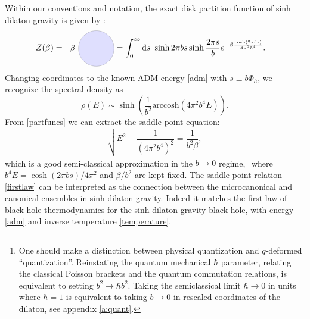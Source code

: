 \documentclass[a4paper,titlepage,12pt]{article}
\numberwithin{equation}{section}
\begin{document}
Within our conventions and notation, the exact disk partition function of sinh dilaton gravity is given by \cite{Mertens:2020hbs}:
\begin{align}
\label{partfuncs}
Z(\beta) &=~ \begin{tikzpicture}[baseline={([yshift=-.5ex]current bounding box.center)}, scale=0.5]
\draw[fill=blue!40!white,opacity=0.3] (0,0) ellipse (1.5 and 1.5);
\node at (-2,0) {\small $\beta$};
\end{tikzpicture} = \int_{0}^{\infty} \mathrm{d}s ~\sinh 2\pi b s \sinh\frac{2\pi s}{b} e^{-\beta \frac{\cosh(2\pi b s)}{4\pi^2b^4} }.
\end{align}
Changing coordinates to the known ADM energy \eqref{adm} with $s\equiv b\Phi_h$, we recognize the spectral density as
\begin{equation}
\rho(E) \sim \sinh\left(\frac{1}{b^2}\text{arccosh}( 4\pi^2b^4E)\right).
\end{equation}
From \eqref{partfuncs} we can extract the saddle point equation:
\begin{equation}
\label{firstlaw}
\sqrt{E^2-\frac{1}{(4\pi^2b^4)^2}} = \frac{1}{b^2 \beta},
\end{equation}
which is a good  semi-classical approximation in the $b\to 0$ regime,\footnote{One should make a distinction between physical quantization and $q$-deformed ``quantization''. Reinstating the quantum mechanical $\hbar$ parameter, relating the classical Poisson brackets and the quantum commutation relations, is equivalent to setting $b^2\rightarrow \hbar b^2$. Taking the semiclassical limit $\hbar\rightarrow0$ in units where $\hbar=1$ is equivalent to taking $b\rightarrow0$ in rescaled coordinates of the dilaton, see appendix \ref{a:quant}. } where $b^4E = \cosh(2\pi bs)/4\pi^2$ and $\beta/b^2$ are kept fixed. The saddle-point relation \eqref{firstlaw} can be interpreted as the connection between the microcanonical and canonical ensembles in sinh dilaton gravity. Indeed it matches the first law of black hole thermodynamics for the sinh dilaton gravity black hole, with energy \eqref{adm} and inverse temperature \eqref{temperature}.
\end{document}
